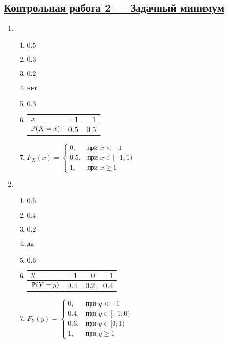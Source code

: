 \subsection[Кр 2]{\hyperref[sec:minimum_kr_02]{Контрольная работа 2 — Задачный минимум}}
\label{sec:sol_minimum_kr_02}


\begin{multicols}{2}
\begin{enumerate}

\item
\begin{enumerate}
\item   $0.5 $
\item   $0.3$
\item   $0.2$
\item   нет
\item   $0.3$
\item
\begin{tabular}{lrr}
\toprule
$x$ & $-1$  & $1$   \\ \midrule
$\P(X=x)$ & $0.5$ & $0.5$ \\ \bottomrule
\end{tabular}
\item  $F_{X}(x) = \begin{cases}
0, & \text{при } x < -1 \\
0.5 , & \text{при } x \in [-1;1) \\
1, & \text{при }  x \geq 1
\end{cases}$
\end{enumerate}
\item
\begin{enumerate}
\item   $0.5$
\item   $0.4$
\item   $0.2$
\item   да
\item   $0.6$
\item
\begin{tabular}{lrrr}
\toprule
$y$ & $-1$  & $0$   & $1$   \\ \midrule
$\P(Y=y)$ & $0.4$ & $0.2$ & $0.4$ \\ \bottomrule
\end{tabular}
\item   $F_{Y}(y) = \begin{cases}
0, & \text{при } y < -1 \\
0.4 , & \text{при } y \in [-1;0) \\
0.6, & \text{при }  y \in [0;1)\\
1, & \text{при } y \geq 1
\end{cases}$
\end{enumerate}


\end{enumerate}
\end{multicols}
